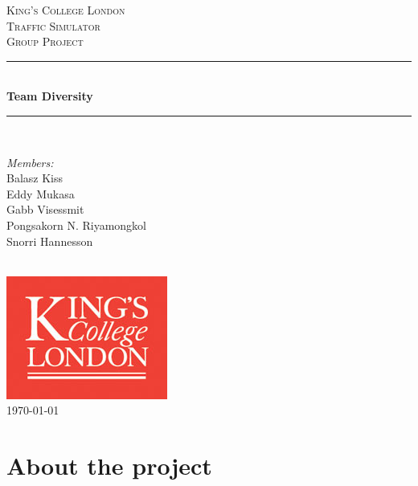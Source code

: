 \documentclass[11pt]{article}
\begin{document}

\begin{titlepage}

\newcommand{\HRule}{\rule{\linewidth}{0.5mm}}
\center
\textsc{\LARGE King's College London}\\[1.5cm]
\textsc{\Large Traffic Simulator}\\[0.5cm]
\textsc{\large Group Project}\\[0.5cm]
\HRule \\[0.4cm]
{ \huge \bfseries Team Diversity}\\[0.4cm]
\HRule \\[1.5cm]

\begin{minipage}{0.4\textwidth} \large
\begin{center}
\emph{Members:}\\
Balasz Kiss \\
Eddy Mukasa \\
Gabb Visessmit \\
Pongsakorn N. Riyamongkol \\
Snorri Hannesson
\end{center}
\end{minipage}
\\[2cm]

\includegraphics{KingsLogo}\\[1cm] 

{\large \today}\\[3cm]

\vfill

\end{titlepage}


\section{About the project}
\end{document}
